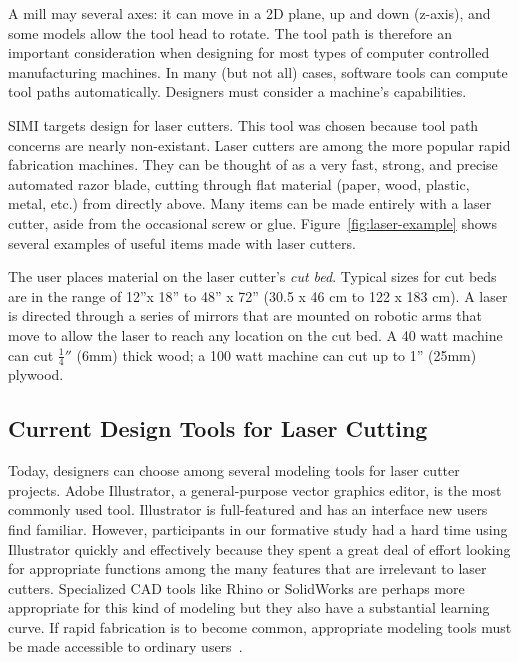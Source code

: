A mill may several axes: it can move in a 2D plane, up and down
(z-axis), and some models allow the tool head to rotate. The tool path
is therefore an important consideration when designing for most types
of computer controlled manufacturing machines. In many (but not all)
cases, software tools can compute tool paths automatically. Designers
must consider a machine's capabilities.

SIMI targets design for laser cutters. This tool was chosen because
tool path concerns are nearly non-existant. Laser cutters are among
the more popular rapid fabrication machines. They can be thought of as
a very fast, strong, and precise automated razor blade, cutting
through flat material (paper, wood, plastic, metal, etc.) from
directly above. Many items can be made entirely with a laser cutter,
aside from the occasional screw or
glue. Figure~\ref{fig:laser-example} shows several examples of useful
items made with laser cutters. %

The user places material on the laser cutter's \textit{cut
  bed}. Typical sizes for cut beds are in the range of 12''x 18'' to
48'' x 72'' (30.5 x 46 cm to 122 x 183 cm). A laser is directed
through a series of mirrors that are mounted on robotic arms that move
to allow the laser to reach any location on the cut bed. A 40 watt
machine can cut $\frac{1}{4}''$ (6mm) thick wood; a 100 watt machine
can cut up to 1'' (25mm) plywood.

\subsection{Current Design Tools for Laser Cutting}

Today, designers can choose among several modeling tools for laser
cutter projects. Adobe Illustrator, a general-purpose vector graphics
editor, is the most commonly used tool. Illustrator is full-featured
and has an interface new users find familiar. However, participants in
our formative study had a hard time using Illustrator quickly and
effectively because they spent a great deal of effort looking for
appropriate functions among the many features that are irrelevant to
laser cutters. Specialized CAD tools like Rhino or SolidWorks are
perhaps more appropriate for this kind of modeling but they also have
a substantial learning curve. If rapid fabrication is to become
common, appropriate modeling tools must be made accessible to ordinary
users~\cite{lipson-homefactory}.



